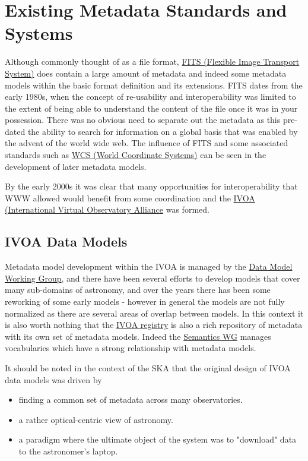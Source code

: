 \section{Existing Metadata Standards and Systems}\label{sec:exist_mod}

Although commonly thought of as a file format, \href{https://fits.gsfc.nasa.gov}{FITS (Flexible Image Transport System)} does contain a large amount of metadata and indeed some metadata models within the basic format definition and its extensions. FITS dates from the early 1980s, when the concept of re-usability and interoperability was limited to the extent of being able to understand the content of the file once it was in your possession. There was no obvious need to separate out the metadata as this pre-dated the ability to search for information on a global basis that was enabled by the advent of the world wide web. The influence of FITS and some associated standards such as \href{https://fits.gsfc.nasa.gov/fits_wcs.html}{WCS (World Coordinate Systems)} can be seen in the development of later metadata models.

By the early 2000s it was clear that many opportunities for interoperability that WWW allowed would benefit from some coordination and the \href{https://www.ivoa.net}{IVOA (International Virtual Observatory Alliance} was formed.

\subsection{IVOA Data Models}

Metadata model development within the IVOA is managed by the \href{https://wiki.ivoa.net/twiki/bin/view/IVOA/IvoaDataModel}{Data Model Working Group}, and there have been several efforts to develop models that cover many sub-domains of astronomy, and over the years there has been some reworking of some early models - however in general the models are not fully normalized as there are several areas of overlap between models. In this context it is also worth nothing that the \href{https://wiki.ivoa.net/twiki/bin/view/IVOA/IvoaResReg}{IVOA registry} is also a rich repository of metadata with its own set of metadata models. Indeed the \href{https://wiki.ivoa.net/twiki/bin/view/IVOA/IvoaSemantics}{Semantics WG} manages vocabularies which have  a strong relationship with metadata models.


It should be noted in the context of the SKA that the original design of IVOA data models was driven by 
\begin{itemize}
    \item finding a common set of metadata across many observatories.
    \item a rather optical-centric view of astronomy.
    \item a paradigm where the ultimate object of the system was to "download" data to the astronomer's laptop. 
\end{itemize}

